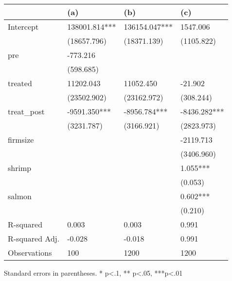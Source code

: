 \begin{table}
\caption{}
\label{}
\begin{center}
\begin{tabular}{llll}
\hline
               & (a)           & (b)           & (c)           \\
\hline
Intercept      & 138001.814*** & 136154.047*** & 1547.006      \\
               & (18657.796)   & (18371.139)   & (1105.822)    \\
pre            & -773.216      &               &               \\
               & (598.685)     &               &               \\
treated        & 11202.043     & 11052.450     & -21.902       \\
               & (23502.902)   & (23162.972)   & (308.244)     \\
treat\_post    & -9591.350***  & -8956.784***  & -8436.282***  \\
               & (3231.787)    & (3166.921)    & (2823.973)    \\
firmsize       &               &               & -2119.713     \\
               &               &               & (3406.960)    \\
shrimp         &               &               & 1.055***      \\
               &               &               & (0.053)       \\
salmon         &               &               & 0.602***      \\
               &               &               & (0.210)       \\
R-squared      & 0.003         & 0.003         & 0.991         \\
R-squared Adj. & -0.028        & -0.018        & 0.991         \\
Observations   & 100           & 1200          & 1200          \\
\hline
\end{tabular}
\end{center}
\end{table}
\bigskip
Standard errors in parentheses. \newline 
* p<.1, ** p<.05, ***p<.01
